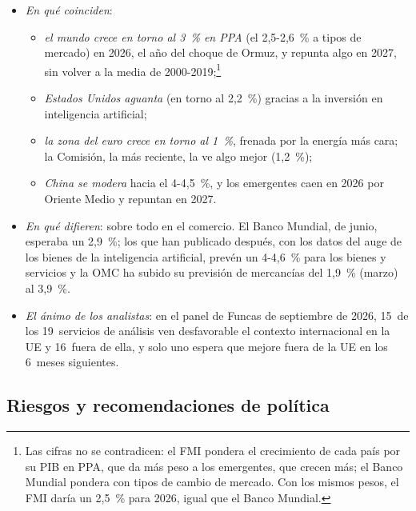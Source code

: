 \documentclass[11pt]{article}
\begin{document}
\begin{itemize}
\item \emph{En qué coinciden}:
  \begin{itemize}
  \item \emph{el mundo crece en torno al 3~\% en PPA} (el 2,5-2,6~\% a tipos de mercado) en 2026, el año del choque de Ormuz, y repunta algo en 2027, sin volver a la media de 2000-2019;\footnote{Las cifras no se contradicen: el FMI pondera el crecimiento de cada país por su PIB en PPA, que da más peso a los emergentes, que crecen más; el Banco Mundial pondera con tipos de cambio de mercado. Con los mismos pesos, el FMI daría un 2,5~\% para 2026, igual que el Banco Mundial\nocite{FMI2026WEO}.}
  \item \emph{Estados Unidos aguanta} (en torno al 2,2~\%) gracias a la inversión en inteligencia artificial;
  \item \emph{la zona del euro crece en torno al 1~\%}, frenada por la energía más cara; la Comisión, la más reciente, la ve algo mejor (1,2~\%)\nocite{CE2026Otono};
  \item \emph{China se modera} hacia el 4-4,5~\%, y los emergentes caen en 2026 por Oriente Medio y repuntan en 2027\nocite{FMI2026WEO,CE2026Otono,BM2026GEP}.
  \end{itemize}
\item \emph{En qué difieren}: sobre todo en el comercio. El Banco Mundial, de junio, esperaba un 2,9~\%; los que han publicado después, con los datos del auge de los bienes de la inteligencia artificial, prevén un 4-4,6~\% para los bienes y servicios y la OMC ha subido su previsión de mercancías del 1,9~\% (marzo) al 3,9~\%\nocite{OMC2026PerspectivasOct,BM2026GEP}.
\item \emph{El ánimo de los analistas}: en el panel de Funcas de septiembre de 2026, 15~de los 19~servicios de análisis ven desfavorable el contexto internacional en la UE y 16~fuera de ella, y solo uno espera que mejore fuera de la UE en los 6~meses siguientes\nocite{Funcas2026Panel}.
\end{itemize}

\subsection{Riesgos y recomendaciones de política}\label{sec:riesgos}
\end{document}
